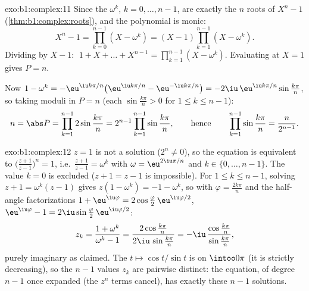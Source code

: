 \begin{solution}{exo:b1:complex:11}
Since the $\omega^k$, $k = 0, \dots, n-1$, are exactly the $n$ roots
of $X^n - 1$ (\cref{thm:b1:complex:roots}), and the polynomial is
monic:
\[
X^n - 1 = \prod_{k=0}^{n-1} (X - \omega^k)
= (X - 1) \prod_{k=1}^{n-1} (X - \omega^k).
\]
Dividing by $X - 1$: $\;1 + X + \dots + X^{n-1} = \prod_{k=1}^{n-1}
(X - \omega^k)$. Evaluating at $X = 1$ gives $P = n$.

Now $1 - \omega^k = -\eu^{\iu k\pi/n}\bigl(\eu^{\iu k\pi/n} -
\eu^{-\iu k\pi/n}\bigr) = -2\iu\,\eu^{\iu k\pi/n} \sin\frac{k\pi}{n}$,
so taking moduli in $P = n$ (each $\sin\frac{k\pi}n > 0$ for $1 \leq k
\leq n-1$):
\[
n = \abs P = \prod_{k=1}^{n-1} 2\sin\frac{k\pi}{n}
= 2^{n-1} \prod_{k=1}^{n-1} \sin\frac{k\pi}{n},
\qquad\text{hence}\qquad
\prod_{k=1}^{n-1} \sin\frac{k\pi}{n} = \frac{n}{2^{n-1}} .
\]
\end{solution}

\begin{solution}{exo:b1:complex:12}
$z = 1$ is not a solution ($2^n \neq 0$), so the equation is
equivalent to $\bigl(\frac{z+1}{z-1}\bigr)^n = 1$, i.e.\
$\frac{z+1}{z-1} = \omega^k$ with $\omega = \eu^{2\iu\pi/n}$ and
$k \in \{0, \dots, n-1\}$. The value $k = 0$ is excluded ($z + 1 =
z - 1$ is impossible). For $1 \leq k \leq n - 1$, solving
$z + 1 = \omega^k(z - 1)$ gives $z(1 - \omega^k) = -1 - \omega^k$,
so with $\varphi = \frac{2k\pi}{n}$ and the half-angle
factorizations $1 + \eu^{\iu\varphi} = 2\cos\frac\varphi2\,
\eu^{\iu\varphi/2}$, $\eu^{\iu\varphi} - 1 = 2\iu\sin\frac\varphi2
\,\eu^{\iu\varphi/2}$:
\[
z_k = \frac{1 + \omega^k}{\omega^k - 1}
= \frac{2\cos\frac{k\pi}{n}}{2\iu\,\sin\frac{k\pi}{n}}
= -\iu\,\frac{\cos\frac{k\pi}{n}}{\sin\frac{k\pi}{n}} ,
\]
purely imaginary as claimed. The  $t \mapsto \cos t/\sin t$ is
\omterm{def:b1:logic:inj}{injective} on $\intoo0\pi$ (it is strictly decreasing), so the
$n - 1$ values $z_k$ are pairwise distinct: the equation, of degree
$n - 1$ once expanded (the $z^n$ terms cancel), has exactly these
$n - 1$ solutions.
\end{solution}

